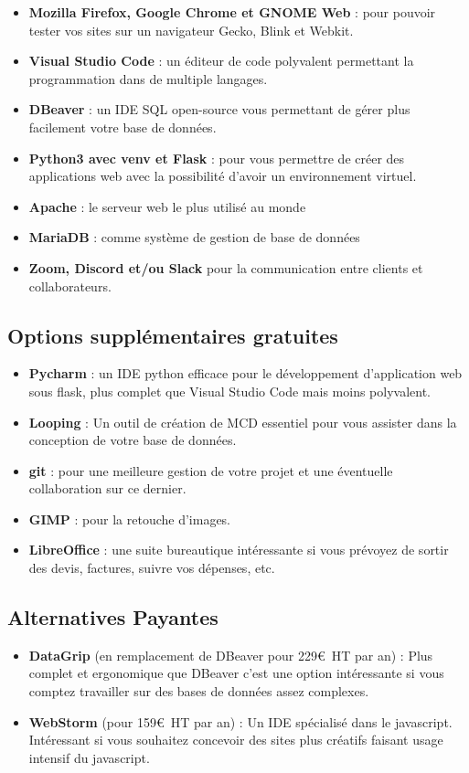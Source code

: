 \begin{itemize}
	\item \textbf{Mozilla Firefox, Google Chrome et GNOME Web} : pour pouvoir tester vos sites sur un navigateur Gecko, Blink et Webkit.
	\item \textbf{Visual Studio Code} : un éditeur de code polyvalent permettant la programmation dans de multiple langages.
	\item \textbf{DBeaver} : un IDE SQL open-source vous permettant de gérer plus facilement votre base de données.
	\item \textbf{Python3 avec venv et Flask} : pour vous permettre de créer des applications web avec la possibilité d'avoir un environnement virtuel.
	\item \textbf{Apache} : le serveur web le plus utilisé au monde 
	\item \textbf{MariaDB} : comme système de gestion de base de données
	\item \textbf{Zoom, Discord et/ou Slack} pour la communication entre clients et collaborateurs.
\end{itemize}

\subsection{Options supplémentaires gratuites}\label{3.3.2}

\begin{itemize}
	\item \textbf{Pycharm} : un IDE python efficace pour le développement d'application web sous flask, plus complet que Visual Studio Code mais moins polyvalent.
	\item \textbf{Looping} : Un outil de création de MCD essentiel pour vous assister dans la conception de votre base de données.
	\item \textbf{git} : pour une meilleure gestion de votre projet et une éventuelle collaboration sur ce dernier.
	\item \textbf{GIMP} : pour la retouche d'images.
	\item \textbf{LibreOffice} : une suite bureautique intéressante si vous prévoyez de sortir des devis, factures, suivre vos dépenses, etc.
\end{itemize}


\subsection{Alternatives Payantes}

\begin{itemize}
	\item \textbf{DataGrip} (en remplacement de DBeaver pour 229\euro\ HT par an) : Plus complet et ergonomique que DBeaver c'est une option intéressante si vous comptez travailler sur des bases de données assez complexes.
	\item \textbf{WebStorm} (pour 159\euro\ HT par an) : Un IDE spécialisé dans le javascript. Intéressant si vous souhaitez concevoir des sites plus créatifs faisant usage intensif du javascript.
\end{itemize}
